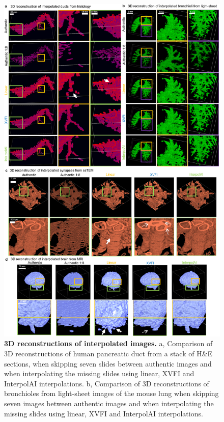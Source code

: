 \begin{refsection}
    \begin{figure}[p] 
      \centering
      \includegraphics[width=\linewidth,                   height=0.85\textheight,                   keepaspectratio]{figures/chapter6/fig_6.png}
      \captionsetup{font=small}
      \caption{\textbf{3D reconstructions of interpolated images.} a, Comparison of 3D
        reconstructions of human pancreatic duct from a stack of H\&E sections, when
        skipping seven slides between authentic images and when interpolating the
        missing slides using linear, XVFI and InterpolAI interpolations. b, Comparison
        of 3D reconstructions of bronchioles from light-sheet images of the mouse lung
        when skipping seven images between authentic images and when interpolating
        the missing slides using linear, XVFI and InterpolAI interpolations.}
      \label{chapter6_fig6}
    \end{figure}
    

\end{refsection}
